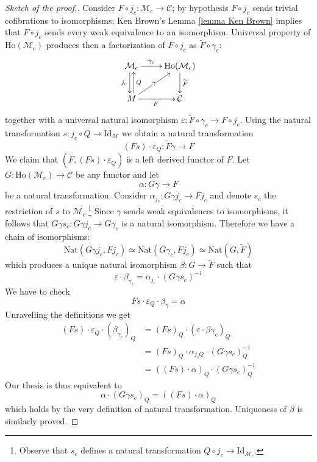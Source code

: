 \begin{proof}[Sketch of the proof.]
Consider $F \circ j_c \colon \mathcal M_c \to \mathcal C$; by hypothesis $F \circ j_c$ sends trivial cofibrations to isomorphisms; Ken Brown's Lemma \ref{lemma Ken Brown} implies that $F \circ j_c$ sends every weak equivalence to an isomorphism. Universal property of $\mathrm{Ho}(\mathcal M_c)$ produces then a factorization of $F \circ j_c$ as $\widetilde{F} \circ \gamma_c$:
\[
\xymatrix{
\mathcal M_c \ar@<-.5ex>[d]_{j_c} \ar[r]^-{\gamma_c} & \mathrm{Ho}(\mathcal M_c) \ar[d]^{\widetilde{F}} \\ M \ar@<-.5ex>[u]_Q \ar[ur]|-\gamma \ar[r]_F & \mathcal C
}
\]
together with a universal natural isomorphism $\varepsilon \colon \widetilde{F} \circ \gamma_c \to F \circ j_c$. Using the natural transformation $s \colon j_c \circ Q \to \mathrm{Id}_{\mathcal M}$ we obtain a natural transformation
\[
(Fs) \cdot \varepsilon_Q \colon \widetilde{F} \gamma \to F
\]
We claim that $(\widetilde{F}, (Fs) \cdot \varepsilon_Q)$ is a left derived functor of $F$. Let $G \colon \mathrm{Ho}(\mathcal M_c) \to \mathcal C$ be any functor and let
\[
\alpha \colon G \gamma \to F
\]
be a natural transformation. Consider $\alpha_{j_c} \colon G \gamma j_c \to F j_c$ and denote $s_c$ the restriction of $s$ to $\mathcal M_c$.\footnote{Observe that $s_c$ defines a natural transformation $Q \circ j_c \to \mathrm{Id}_{\mathcal M_c}$.} Since $\gamma$ sends weak equivalences to isomorphisms, it follows that $G \gamma s_c \colon G \gamma j_c \to G \gamma_c$ is a natural isomorphism. Therefore we have a chain of isomorphisms:
\[
\mathrm{Nat}(G \gamma j_c, F j_c) \simeq \mathrm{Nat}(G\gamma_c, F j_c) \simeq \mathrm{Nat}(G, \widetilde{F})
\]
which produces a unique natural isomorphism $\beta \colon G \to \widetilde{F}$ such that
\[
\varepsilon \cdot \beta_{\gamma_c} = \alpha_{j_c} \cdot (G \gamma s_c)^{-1}
\]
We have to check
\[
Fs \cdot \varepsilon_Q \cdot \beta_\gamma = \alpha
\]
Unravelling the definitions we get
\begin{align*}
(Fs) \cdot \varepsilon_Q \cdot (\beta_{\gamma_c})_Q & = (Fs)_Q \cdot (\varepsilon \cdot \beta \gamma_c)_Q \\
& = (Fs)_Q \cdot \alpha_{j_c Q} \cdot (G \gamma s_c)^{-1}_Q \\
& = ((Fs) \cdot \alpha)_Q \cdot (G \gamma s_c)^{-1}_Q
\end{align*}
Our thesis is thus equivalent to
\[
\alpha \cdot (G \gamma s_c)_Q = ((Fs) \cdot \alpha)_Q
\]
which holds by the very definition of natural transformation. Uniqueness of $\beta$ is similarly proved.
\end{proof}

